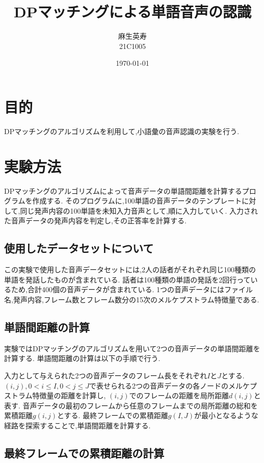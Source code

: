 \documentclass[a4paper,12pt]{article}
\title{DPマッチングによる単語音声の認識}
\author{麻生英寿 \\ 21C1005}
\date{\today}
\begin{document}
\maketitle

\tableofcontents

\section{目的}

DPマッチングのアルゴリズムを利用して,小語彙の音声認識の実験を行う.

\section{実験方法}

DPマッチングのアルゴリズムによって音声データの単語間距離を計算するプログラムを作成する.
そのプログラムに,100単語の音声データのテンプレートに対して,同じ発声内容の100単語を未知入力音声として,順に入力していく.
入力された音声データの発声内容を判定し,その正答率を計算する.

\subsection{使用したデータセットについて}

この実験で使用した音声データセットには,2人の話者がそれぞれ同じ100種類の単語を発話したものが含まれている.
話者は100種類の単語の発話を2回行っているため,合計400個の音声データが含まれている.
1つの音声データにはファイル名,発声内容,フレーム数とフレーム数分の15次のメルケプストラム特徴量である.

\subsection{単語間距離の計算}

実験ではDPマッチングのアルゴリズムを用いて2つの音声データの単語間距離を計算する.
単語間距離の計算は以下の手順で行う.

入力として与えられた2つの音声データのフレーム長をそれぞれ$I$と$J$とする.
$(i,j),0<i\leq I ,0<j\leq J$で表せられる2つの音声データの各ノードのメルケプストラム特徴量の距離を計算し,
$(i,j)$でのフレームの距離を局所距離$d(i,j)$と表す.
音声データの最初のフレームから任意のフレームまでの局所距離の総和を累積距離$g(i,j)$とする.
最終フレームでの累積距離$g(I,J)$が最小となるような経路を探索することで,単語間距離を計算する.

\subsection{最終フレームでの累積距離の計算}
\end{document}
